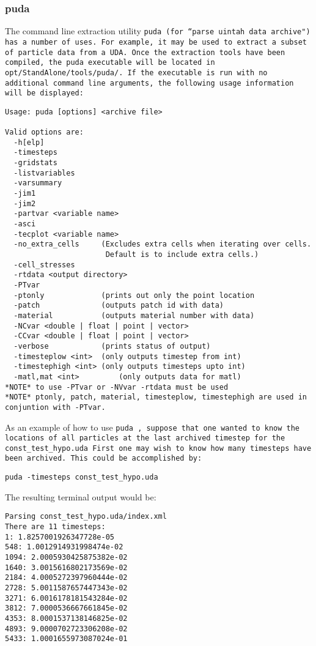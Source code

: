 \subsubsection{puda}

The command line extraction utility \tt puda \normalfont
(for ``parse uintah data archive") has a number of uses.  For example, it
may be used to extract a subset of particle data from a UDA.  Once the
extraction tools have been compiled, the puda executable will be located in 
\tt opt/StandAlone/tools/puda/. \normalfont  If the executable is run with
no additional command line arguments, the following usage information will be
displayed:

\begin{Verbatim}[fontsize=\footnotesize]
Usage: puda [options] <archive file>

Valid options are:
  -h[elp]
  -timesteps
  -gridstats
  -listvariables
  -varsummary
  -jim1
  -jim2
  -partvar <variable name>
  -asci
  -tecplot <variable name>
  -no_extra_cells     (Excludes extra cells when iterating over cells.
                       Default is to include extra cells.)
  -cell_stresses
  -rtdata <output directory>
  -PTvar
  -ptonly             (prints out only the point location
  -patch              (outputs patch id with data)
  -material           (outputs material number with data)
  -NCvar <double | float | point | vector>
  -CCvar <double | float | point | vector>
  -verbose            (prints status of output)
  -timesteplow <int>  (only outputs timestep from int)
  -timestephigh <int> (only outputs timesteps upto int)
  -matl,mat <int>         (only outputs data for matl)
*NOTE* to use -PTvar or -NVvar -rtdata must be used
*NOTE* ptonly, patch, material, timesteplow, timestephigh are used in conjuntion with -PTvar.
\end{Verbatim}

As an example of how to use \tt puda \normalfont, suppose that one wanted to know the locations of all particles at the last archived timestep for the 
\tt const\_test\_hypo.uda \normalfont 
First one may wish to know how many timesteps have been archived.
This could be accomplished by:

\begin{Verbatim}[fontsize=\footnotesize]
 puda -timesteps const_test_hypo.uda
\end{Verbatim}
The resulting terminal output would be:
\begin{Verbatim}[fontsize=\footnotesize]
Parsing const_test_hypo.uda/index.xml
There are 11 timesteps:
1: 1.8257001926347728e-05
548: 1.0012914931998474e-02
1094: 2.0005930425875382e-02
1640: 3.0015616802173569e-02
2184: 4.0005272397960444e-02
2728: 5.0011587657447343e-02
3271: 6.0016178181543284e-02
3812: 7.0000536667661845e-02
4353: 8.0001537138146825e-02
4893: 9.0000702723306208e-02
5433: 1.0001655973087024e-01
\end{Verbatim}

